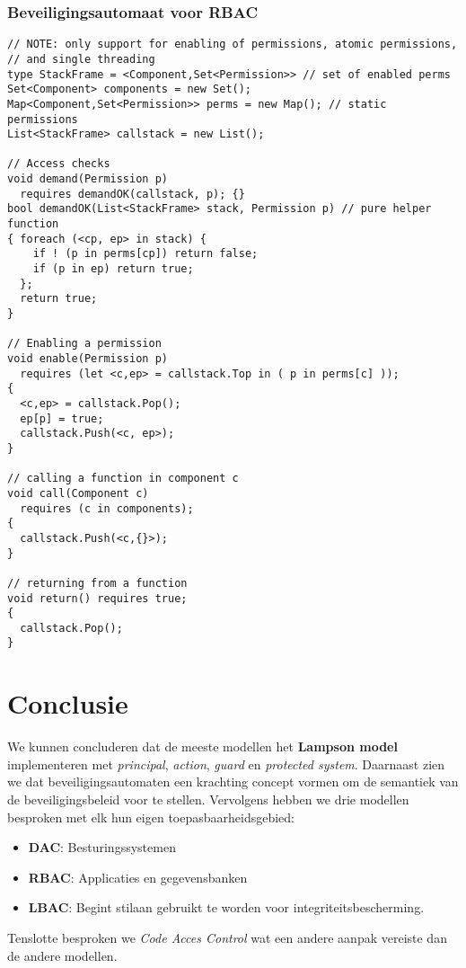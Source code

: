 \documentclass[../main.tex]{subfiles}
\begin{document}
\subsubsection{Beveiligingsautomaat voor RBAC}
\begin{lstlisting}
// NOTE: only support for enabling of permissions, atomic permissions,
// and single threading
type StackFrame = <Component,Set<Permission>> // set of enabled perms
Set<Component> components = new Set();
Map<Component,Set<Permission>> perms = new Map(); // static permissions
List<StackFrame> callstack = new List();

// Access checks
void demand(Permission p)
  requires demandOK(callstack, p); {}
bool demandOK(List<StackFrame> stack, Permission p) // pure helper function
{ foreach (<cp, ep> in stack) {
    if ! (p in perms[cp]) return false;
    if (p in ep) return true;
  };
  return true;
}

// Enabling a permission
void enable(Permission p)
  requires (let <c,ep> = callstack.Top in ( p in perms[c] ));
{
  <c,ep> = callstack.Pop();
  ep[p] = true;
  callstack.Push(<c, ep>);
}

// calling a function in component c
void call(Component c)
  requires (c in components);
{
  callstack.Push(<c,{}>);
}

// returning from a function
void return() requires true;
{
  callstack.Pop();
}
\end{lstlisting}

\section{Conclusie}
We kunnen concluderen dat de meeste modellen het \textbf{Lampson model} implementeren met \textit{principal}, \textit{action}, \textit{guard} en \textit{protected system}. Daarnaast zien we dat beveiligingsautomaten een krachting concept vormen om de semantiek van de beveiligingsbeleid voor te stellen. Vervolgens hebben we drie modellen besproken met elk hun eigen toepasbaarheidsgebied:
\begin{itemize}
	\item \textbf{DAC}: Besturingssystemen
	\item \textbf{RBAC}: Applicaties en gegevensbanken
	\item \textbf{LBAC}: Begint stilaan gebruikt te worden voor integriteitsbescherming.
\end{itemize}
Tenslotte besproken we \textit{Code Acces Control} wat een andere aanpak vereiste dan de andere modellen.
\end{document}
